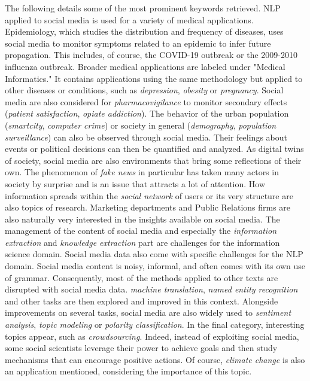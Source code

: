 The following details some of the most prominent keywords retrieved.
NLP applied to social media is used for a variety of medical applications.
Epidemiology, which studies the distribution and frequency of diseases, uses social media to monitor symptoms related to an epidemic to infer future propagation.
This includes, of course, the COVID-19 outbreak or the 2009-2010 influenza outbreak.
Broader medical applications are labeled under "Medical Informatics."
It contains applications using the same methodology but applied to other diseases or conditions, such as \emph{depression}, \emph{obesity} or \emph{pregnancy}.
Social media are also considered for \emph{pharmacovigilance} to monitor secondary effects (\emph{patient satisfaction}, \emph{opiate addiction}).
The behavior of the urban population (\emph{smartcity}, \emph{computer crime}) or society in general (\emph{demography}, \emph{population surveillance}) can also be observed through social media.
Their feelings about events or political decisions can then be quantified and analyzed.
As digital twins of society, social media are also environments that bring some reflections of their own.
The phenomenon of \emph{fake news} in particular has taken many actors in society by surprise and is an issue that attracts a lot of attention.
How information spreads within the \emph{social network} of users or its very structure are also topics of research.
Marketing departments and Public Relations firms are also naturally very interested in the insights available on social media.
The management of the content of social media and especially the \emph{information extraction} and \emph{knowledge extraction} part
are challenges for the information science domain.
Social media data also come with specific challenges for the NLP domain.
Social media content is noisy, informal, and often comes with its own use of grammar.
Consequently, most of the methods applied to other texts are disrupted with social media data.
\emph{machine translation}, \emph{named entity recognition} and other tasks are then explored and improved in this context.
Alongside improvements on several tasks, social media are also widely used to \emph{sentiment analysis}, \emph{topic modeling} or \emph{polarity classification}.
In the final category, interesting topics appear, such as \emph{crowdsourcing}.
Indeed, instead of exploiting social media, some social scientists leverage their power to achieve goals and then study mechanisms that can encourage positive actions.
Of course, \emph{climate change} is also an application mentioned, considering the importance of this topic.

